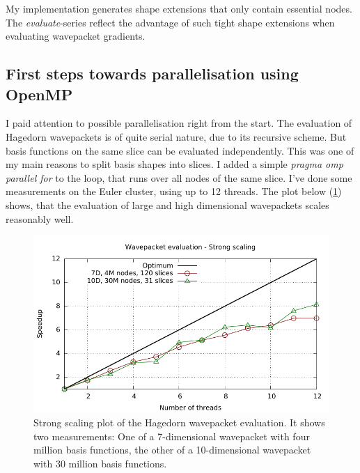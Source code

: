 \documentclass{article}
\begin{document}
My implementation generates shape extensions that only contain essential no\-des.
The \emph{evaluate}-series reflect the advantage of such tight shape extensions
when evaluating wavepacket gradients.

\subsection{First steps towards parallelisation using OpenMP}

I paid attention to possible parallelisation right from the start.
The evaluation of Hagedorn wavepackets is of quite serial nature, due to its
recursive scheme. But basis functions on the same slice can be evaluated independently.
This was one of my main reasons to split basis shapes into slices.
I added a simple \emph{pragma omp parallel for} to the loop, that runs over all nodes
of the same slice. I've done some measurements on the Euler cluster, using up to 12 threads.
The plot below (\ref{fig:hawp_eval_omp}) shows, that the evaluation of large and high dimensional
wavepackets scales reasonably well.

\begin{figure}[H]
  \centering
  \includegraphics[width=1.0\textwidth]{plots/hawp_eval_omp}
  \caption{
    Strong scaling plot of the Hagedorn wavepacket evaluation.
    It shows two measurements: One of a 7-dimensional wavepacket with
    four million basis functions, the other of a 10-dimensional wavepacket with
    30 million basis functions.
  }
  \label{fig:hawp_eval_omp}
\end{figure}
\end{document}

